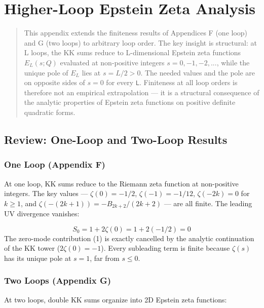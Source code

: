 \documentclass[aps,prd,preprint,superscriptaddress,longbibliography,floatfix]{revtex4-2}
\theoremstyle{remark}
\begin{document}
\section{Higher-Loop Epstein Zeta Analysis}


\begin{quote}
This appendix extends the finiteness results of Appendices F (one loop)
and G (two loops) to arbitrary loop order. The key insight is structural:
at L loops, the KK sums reduce to L-dimensional Epstein zeta functions
$E_L(s; Q)$ evaluated at non-positive integers $s = 0, -1, -2, ...$, while
the unique pole of $E_L$ lies at $s = L/2 > 0$. The needed values and the
pole are on opposite sides of $s = 0$ for every \texttt{L}. Finiteness at all loop
orders is therefore not an empirical extrapolation --- it is a structural
consequence of the analytic properties of Epstein zeta functions on
positive definite quadratic forms.
\end{quote}



\subsection{Review: One-Loop and Two-Loop Results}


\subsubsection{One Loop (Appendix F)}

At one loop, KK sums reduce to the Riemann zeta function at non-positive integers. The key values --- $\zeta(0) = -1/2$, $\zeta(-1) = -1/12$, $\zeta(-2k) = 0$ for $k \geq 1$, and $\zeta(-(2k+1)) = -B_{2k+2}/(2k+2)$ --- are all finite. The leading UV divergence vanishes:


\begin{equation}
    S_{0} = 1 + 2\zeta(0) = 1 + 2(-1/2) = 0
\end{equation}
The zero-mode contribution (1) is exactly cancelled by the analytic continuation of the KK tower ($2\zeta(0) = -1$). Every subleading term is finite because $\zeta(s)$ has its unique pole at $s = 1$, far from $s \leq 0$.


\subsubsection{Two Loops (Appendix G)}

At two loops, double KK sums organize into 2D Epstein zeta functions:
\end{document}
